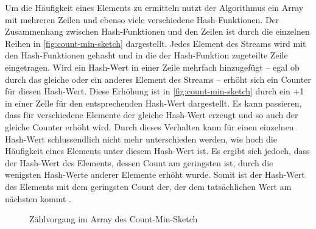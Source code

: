 Um die Häufigkeit eines Elements zu ermitteln 
nutzt der Algorithmus ein Array mit mehreren Zeilen 
und ebenso viele verschiedene Hash-Funktionen.
Der Zusammenhang zwischen Hash-Funktionen und den Zeilen ist durch die einzelnen Reihen in \autoref{fig:count-min-sketch} dargestellt. 
Jedes Element des Streams wird mit den Hash-Funktionen gehasht 
und in die der Hash-Funktion zugeteilte Zeile eingetragen. 
Wird ein Hash-Wert in einer Zeile mehrfach hinzugefügt -- egal ob durch das gleiche oder ein anderes Element des Streams -- 
erhöht sich ein Counter für diesen Hash-Wert. 
Diese Erhöhung ist in \autoref{fig:count-min-sketch} durch ein +1 in einer Zelle für den entsprechenden Hash-Wert dargestellt.
Es kann passieren, dass für verschiedene Elemente der gleiche Hash-Wert erzeugt 
und so auch der gleiche Counter erhöht wird.
Durch dieses Verhalten kann für einen einzelnen Hash-Wert 
schlussendlich nicht mehr unterschieden werden, 
wie hoch die Häufigkeit eines Elements unter diesem Hash-Wert ist. 
Es ergibt sich jedoch, dass der Hash-Wert des Elements, dessen Count am geringsten ist, 
durch die wenigsten Hash-Werte anderer Elemente erhöht wurde. 
Somit ist der Hash-Wert des Elements mit dem geringsten Count der, 
der dem tatsächlichen Wert am nächsten kommt \cite{cormode2017}.

\begin{figure}
	\centering
	\caption{Zählvorgang im Array des Count-Min-Sketch}
	\label{fig:count-min-sketch}
\end{figure}

